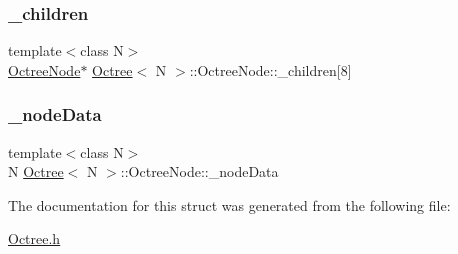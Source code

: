 \subsubsection{\texorpdfstring{\+\_\+children}{\_children}}
{\footnotesize\ttfamily template$<$class N$>$ \\
\hyperlink{structOctree_1_1OctreeNode}{Octree\+Node}$\ast$ \hyperlink{classOctree}{Octree}$<$ N $>$\+::Octree\+Node\+::\+\_\+children\mbox{[}8\mbox{]}}

\mbox{\label{structOctree_1_1OctreeNode_acf3ff3707042ca6eaf42c6e1b5520376}} 
\subsubsection{\texorpdfstring{\+\_\+node\+Data}{\_nodeData}}
{\footnotesize\ttfamily template$<$class N$>$ \\
N \hyperlink{classOctree}{Octree}$<$ N $>$\+::Octree\+Node\+::\+\_\+node\+Data}



The documentation for this struct was generated from the following file\+:\begin{DoxyCompactItemize}
\item 
\hyperlink{Octree_8h}{Octree.\+h}\end{DoxyCompactItemize}
